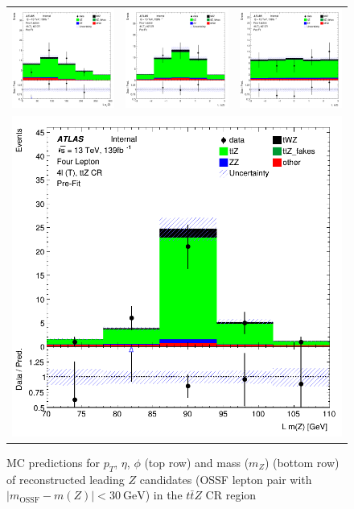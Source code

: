 \begin{figure}[htbp]
\centering
  \begin{tabular}{ccc}

    \includegraphics[width=.2\textwidth]{figures/PreFitPlots/lep4_ttZ_4T_0_Z_pt}&
    \includegraphics[width=.2\textwidth]{figures/PreFitPlots/lep4_ttZ_4T_0_Z_eta} &
    \includegraphics[width=.2\textwidth]{figures/PreFitPlots/lep4_ttZ_4T_0_Z_phi} \\
    \multicolumn{3}{c}{\includegraphics[width=.2\textwidth]{figures/PreFitPlots/lep4_ttZ_4T_0_Z_mass}}

  \end{tabular}
    \caption{MC predictions for $p_{T}$, $\eta$, $\phi$ (top row) and mass ($m_Z$) (bottom row) of reconstructed leading $Z$ candidates (OSSF lepton pair with $|m_{\text{OSSF}} - m(Z)| <  \SI{30}{\GeV}$) in the $t\bar{t}Z$ CR region }
  \label{fig:4lep-ttZ-CR-ZCands-Plots}
\end{figure}




